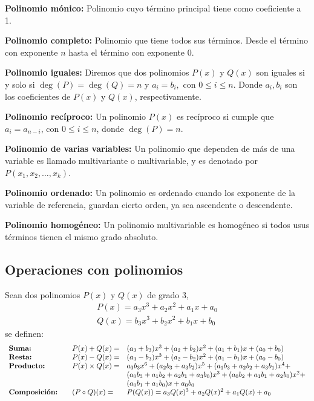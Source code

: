 \textbf{Polinomio mónico:} Polinomio cuyo término principal tiene como coeficiente a 1.

\textbf{Polinomio completo:} Polinomio que tiene todos sus términos.
Desde el término con exponente $n$ hasta el término con exponente 0.

\textbf{Polinomio iguales:} Diremos que dos polinomios $P(x)$ y $Q(x)$ son iguales si y solo si $\deg{(P)} = \deg{(Q)} = n$ y $a_i = b_i,$ con $0\leq i\leq n$.
Donde $a_i, b_i$ son los coeficientes de $P(x)$ y $Q(x)$, respectivamente.

\textbf{Polinomio recíproco:}\label{reci-polynomial}
Un polinomio $P(x)$ es recíproco si cumple que $a_i = a_{n-i}$, con $0\leq i\leq n$, donde $\deg{(P)} = n$.

\textbf{Polinomio de varias variables:} Un polinomio que dependen de más de una variable es llamado multivariante o multivariable, y es denotado por $P(x_1, x_2, \dots, x_k)$.

\textbf{Polinomio ordenado:} Un polinomio es ordenado cuando los exponente de la variable de referencia, guardan cierto orden, ya sea ascendente o descendente.

\textbf{Polinomio homogéneo:} Un polinomio multivariable es homogéneo si todos usus términos tienen el mismo grado absoluto.


\subsection{Operaciones con polinomios}

Sean dos polinomios $P(x)$ y $Q(x)$ de grado 3,
\begin{gather*}
    P(x) = a_3 x^3 + a_2 x^2 + a_1 x + a_0\\
    Q(x) = b_3 x^3 + b_2 x^2 + b_1 x + b_0
\end{gather*}
se definen:
\[
    \begin{array}{lcll}
        \text{\textbf{Suma:}} && P(x) + Q(x) =& (a_3+b_3)x^3+(a_2+b_2)x^2+(a_1+b_1)x+(a_0+b_0)\\
        \text{\textbf{Resta:}} && P(x) - Q(x) =& (a_3-b_3)x^3+(a_2-b_2)x^2+(a_1-b_1)x+(a_0-b_0)\\
        \text{\textbf{Producto:}} && P(x)\times Q(x) =& a_3 b_3 x^6 + (a_2 b_3 + a_3 b_2)x^5 + (a_1 b_3 + a_2 b_2 + a_3 b_1)x^4 +\\
                                  &&&(a_0 b_3 + a_1 b_2 + a_2 b_1 + a_3 b_0)x^3 + (a_0 b_2 + a_1 b_1 + a_2 b_0)x^2 +\\
                                  &&&(a_0 b_1 + a_1 b_0)x + a_0 b_0\\
        \text{\textbf{Composición:}} && (P \circ Q)(x) =& P(Q(x)) = a_3 Q(x)^3 + a_2 Q(x)^2 + a_1 Q(x) + a_0
    \end{array}
\]

